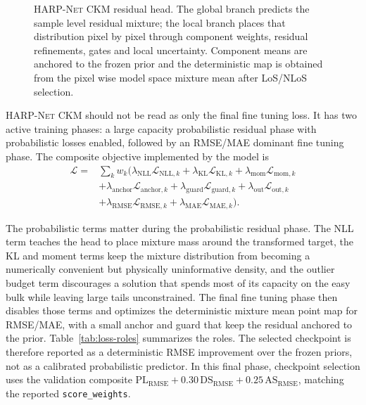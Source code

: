 \documentclass[journal]{IEEEtran}
\begin{document}
\begin{figure}[!t]
{}
\caption{\textsc{HARP-Net CKM} residual head. The global branch predicts the
sample level residual mixture; the local branch places that distribution
pixel by pixel through component weights, residual refinements, gates and local
uncertainty. Component means are anchored to the frozen prior and the
deterministic map is obtained from the pixel wise model space mixture mean after LoS/NLoS
selection.}
\label{fig:residual-head}
\end{figure}

\textsc{HARP-Net CKM} should not be read as only the final fine tuning loss. It has two active
training phases: a large capacity probabilistic residual phase with probabilistic losses
enabled, followed by an RMSE/MAE dominant fine tuning phase. The composite
objective implemented by the model is
\begin{equation}
\begin{aligned}
\mathcal{L}
={}&
\sum_k w_k\bigl(
\lambda_{\mathrm{NLL}}\mathcal{L}_{\mathrm{NLL},k}
+\lambda_{\mathrm{KL}}\mathcal{L}_{\mathrm{KL},k}
+\lambda_{\mathrm{mom}}\mathcal{L}_{\mathrm{mom},k}\\
&+\lambda_{\mathrm{anchor}}\mathcal{L}_{\mathrm{anchor},k}
+\lambda_{\mathrm{guard}}\mathcal{L}_{\mathrm{guard},k}
+\lambda_{\mathrm{out}}\mathcal{L}_{\mathrm{out},k}\\
&+\lambda_{\mathrm{RMSE}}\mathcal{L}_{\mathrm{RMSE},k}
+\lambda_{\mathrm{MAE}}\mathcal{L}_{\mathrm{MAE},k}
\bigr).
\end{aligned}
\label{eq:loss}
\end{equation}

The probabilistic terms matter during the probabilistic residual phase. The NLL term
teaches the head to place mixture mass around the transformed target, the KL
and moment terms keep the mixture distribution from becoming a numerically
convenient but physically uninformative density, and the outlier budget term
discourages a solution that spends most of its capacity on the easy bulk while
leaving large tails unconstrained. The final fine tuning phase then disables
those terms and optimizes the deterministic mixture mean point map for RMSE/MAE,
with a small anchor and guard that keep the residual anchored to the prior.
Table~\ref{tab:loss-roles} summarizes the roles. The selected checkpoint is
therefore reported as a deterministic RMSE improvement over the frozen priors,
not as a calibrated probabilistic predictor. In this final phase, checkpoint
selection uses the validation composite
\(\mathrm{PL}_{\mathrm{RMSE}}+0.30\,\mathrm{DS}_{\mathrm{RMSE}}
+0.25\,\mathrm{AS}_{\mathrm{RMSE}}\), matching the reported
\texttt{score\_weights}.
\end{document}
